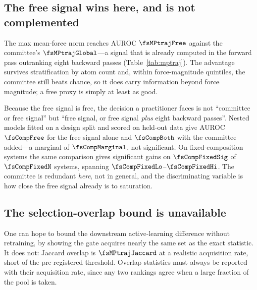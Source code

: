 \begin{table}[t]
\centering
\caption{\textbf{On a real materials pool a free signal outranks every committee
statistic.} AUROC on $\fsMPtrajN$ MPtraj crystals under a frozen foundation-model
trunk. The last two columns are post-hoc diagnostics: AUROC recomputed within
atom-count quartiles and within force-magnitude quintiles, so neither the
extensivity confound nor force magnitude itself can explain the ordering.
$\|\bar{f}\|$ is bold because it is the signal that costs nothing.}
\label{tab:mptraj}
\small

\end{table}

\subsection{The free signal wins here, and is not complemented}
The max mean-force norm reaches AUROC $\fsMPtrajFree$ against the committee's
$\fsMPtrajGlobal$---a signal that is already computed in the forward pass
outranking eight backward passes (Table~\ref{tab:mptraj}). The advantage survives stratification by atom
count and, within force-magnitude quintiles, the committee still beats chance,
so it does carry information beyond force magnitude; a free proxy is simply at
least as good.

Because the free signal is free, the decision a practitioner faces is not
``committee or free signal'' but ``free signal, or free signal \emph{plus} eight
backward passes''. Nested models fitted on a design split and scored on held-out
data give AUROC $\fsCompFree$ for the free signal alone and $\fsCompBoth$ with the
committee added---a marginal of $\fsCompMarginal$, not significant. On
fixed-composition systems the same comparison gives significant gains on
$\fsCompFixedSig$ of $\fsCompFixedN$ systems, spanning
$\fsCompFixedLo$--$\fsCompFixedHi$. The committee is redundant \emph{here}, not
in general, and the discriminating variable is how close the free signal already
is to saturation.

\subsection{The selection-overlap bound is unavailable}
One can hope to bound the downstream active-learning difference without
retraining, by showing the gate acquires nearly the same set as the exact
statistic. It does not: Jaccard overlap is $\fsMPtrajJaccard$ at a realistic
acquisition rate, short of the pre-registered threshold. Overlap statistics must
always be reported with their acquisition rate, since any two rankings agree when
a large fraction of the pool is taken.



